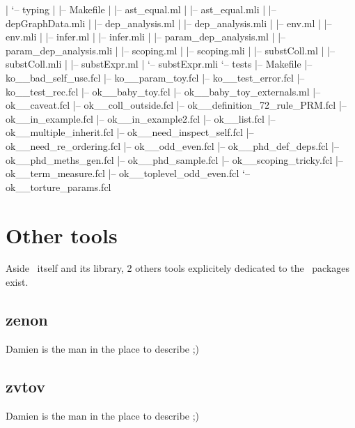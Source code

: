 \begin{itemize}
\begin{itemize}
|   `-- typing
|       |-- Makefile
|       |-- ast\_equal.ml
|       |-- ast\_equal.mli
|       |-- depGraphData.mli
|       |-- dep\_analysis.ml
|       |-- dep\_analysis.mli
|       |-- env.ml
|       |-- env.mli
|       |-- infer.ml
|       |-- infer.mli
|       |-- param\_dep\_analysis.ml
|       |-- param\_dep\_analysis.mli
|       |-- scoping.ml
|       |-- scoping.mli
|       |-- substColl.ml
|       |-- substColl.mli
|       |-- substExpr.ml
|       `-- substExpr.mli
`-- tests
    |-- Makefile
    |-- ko\_\_bad\_self\_use.fcl
    |-- ko\_\_param\_toy.fcl
    |-- ko\_\_test\_error.fcl
    |-- ko\_\_test\_rec.fcl
    |-- ok\_\_baby\_toy.fcl
    |-- ok\_\_baby\_toy\_externals.ml
    |-- ok\_\_caveat.fcl
    |-- ok\_\_coll\_outside.fcl
    |-- ok\_\_definition\_72\_rule\_PRM.fcl
    |-- ok\_\_in\_example.fcl
    |-- ok\_\_in\_example2.fcl
    |-- ok\_\_list.fcl
    |-- ok\_\_multiple\_inherit.fcl
    |-- ok\_\_need\_inspect\_self.fcl
    |-- ok\_\_need\_re\_ordering.fcl
    |-- ok\_\_odd\_even.fcl
    |-- ok\_\_phd\_def\_deps.fcl
    |-- ok\_\_phd\_meths\_gen.fcl
    |-- ok\_\_phd\_sample.fcl
    |-- ok\_\_scoping\_tricky.fcl
    |-- ok\_\_term\_measure.fcl
    |-- ok\_\_toplevel\_odd\_even.fcl
    `-- ok\_\_torture\_params.fcl
  \end{itemize}
\end{itemize}

\section{Other tools}
Aside \focalizec\ itself and its library, 2 others tools explicitely
dedicated to the \focalize\ packages exist.

\subsection{zenon}
Damien is the man in the place to describe ;)

\subsection{zvtov}
Damien is the man in the place to describe ;)
